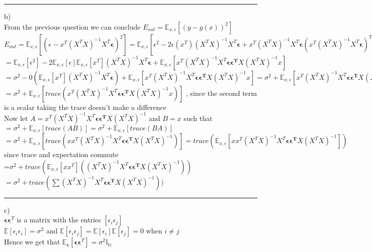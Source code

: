 \documentclass{article}
\begin{document}
\par\noindent\rule{\textwidth}{0.4pt}

b) \\ 

From the previous question we can conclude $E_{out} = \mathbb{E}_{x, \epsilon}
[(y-g(x))^2]$ \\ 
$E_{out} = \mathbb{E}_{x, \epsilon}[(\epsilon - x^T (X^TX)^{-1}X^T \bm{\epsilon} )^2]
= \mathbb{E}_{x, \epsilon}[\epsilon^2 - 2\epsilon(x^T) (X^TX)^{-1}X^T \bm{\epsilon} +  x^T (X^TX)^{-1}X^T \bm{\epsilon} ( x^T (X^TX)^{-1}X^T \bm{\epsilon})^T ]$
\\ $ = \mathbb{E}_{x, \epsilon}[\epsilon^2] - 2 \mathbb{E}_{x, \epsilon}[\epsilon]\mathbb{E}_{x, \epsilon}[x^T](X^TX)^{-1}X^T \bm{\epsilon} + 
\mathbb{E}_{x, \epsilon}[x^T (X^TX)^{-1}X^T \bm{\epsilon} \bm{\epsilon^T} X (X^TX)^{-1}x]$
 \\ 
 $ = \sigma^2 - 0(\mathbb{E}_{x, \epsilon}[x^T](X^TX)^{-1}X^T \bm{\epsilon}) + \mathbb{E}_{x, \epsilon}[x^T (X^TX)^{-1}X^T \bm{\epsilon} \bm{\epsilon^T} X (X^TX)^{-1}x]
  = \sigma^2 + \mathbb{E}_{x, \epsilon}[x^T (X^TX)^{-1}X^T \bm{\epsilon} \bm{\epsilon^T} X (X^TX)^{-1}x] $
  \\
  $ = \sigma^2 + \mathbb{E}_{x, \epsilon}[trace(x^T (X^TX)^{-1}X^T \bm{\epsilon} \bm{\epsilon^T} X (X^TX)^{-1}x)]$ , since the second term is a scalar taking the trace doesn't make a difference
  \\
  Now let $A=x^T (X^TX)^{-1}X^T \bm{\epsilon} \bm{\epsilon^T} X (X^TX)^{-1}$ and $B=x$ such that 
  $= \sigma^2 + \mathbb{E}_{x, \epsilon}[trace(AB)] = \sigma^2 + \mathbb{E}_{x, \epsilon}[trace(BA)] $ \\ 
  $ = \sigma^2  +  \mathbb{E}_{x, \epsilon}[trace(xx^T (X^TX)^{-1}X^T \bm{\epsilon} \bm{\epsilon^T} X (X^TX)^{-1})] = trace(\mathbb{E}_{x, \epsilon}[xx^T (X^TX)^{-1}X^T \bm{\epsilon} \bm{\epsilon^T} X (X^TX)^{-1}]) $ since trace and expectation commute
  \\
  =$ \sigma^2 + trace(\mathbb{E}_{x, \epsilon}[xx^T]((X^TX)^{-1}X^T \bm{\epsilon} \bm{\epsilon^T} X (X^TX)^{-1}))$
  \\ $ = \sigma^2 + trace(\sum (X^TX)^{-1}X^T \bm{\epsilon} \bm{\epsilon^T} X (X^TX)^{-1}) )$

\par\noindent\rule{\textwidth}{0.4pt}

c) \\ 

$\bm{\epsilon} \bm{\epsilon}^T $  is a matrix with the  entries $[\epsilon_i \epsilon_j]$  \\ 
$\mathbb{E}[\epsilon_i \epsilon_i] = \sigma^2$ and $\mathbb{E}[\epsilon_i \epsilon_j]  = \mathbb{E}[\epsilon_i]\mathbb{E}[\epsilon_j] = 0 $ when $ i \neq j $
\\
Hence we get that $\mathbb{E}_{\bm \epsilon}[\bm{\epsilon}\bm{\epsilon}^T]
 = \sigma^2 \mathbb{I_{N}}$
\end{document}
